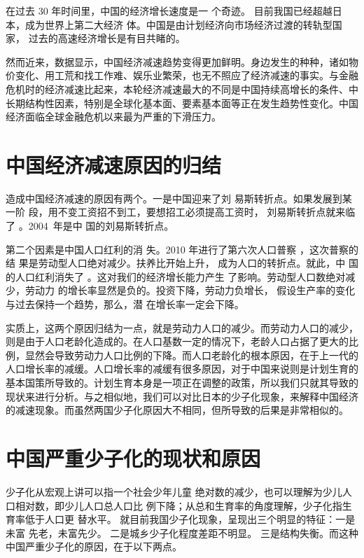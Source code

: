 \documentclass[cs5size,a4paper,nofonts]{ctexart}
\begin{document}
\begin{multicols}{2}

在过去 30 年时间里，中国的经济增长速度是一
个奇迹。
目前我国已经超越日本，成为世界上第二大经济
体。中国是由计划经济向市场经济过渡的转轨型国家，
过去的高速经济增长是有目共睹的。

然而近来，数据显示，中国经济减速趋势变得更加鲜明。身边发生的种种，诸如物价变化、用工荒和找工作难、娱乐业繁荣，也无不照应了经济减速的事实。与金融危机时的经济减速比起来，本轮经济减速最大的不同是中国持续高增长的条件、中长期结构性因素，特别是全球化基本面、要素基本面等正在发生趋势性变化。中国经济面临全球金融危机以来最为严重的下滑压力。

\section{中国经济减速原因的归结}

造成中国经济减速的原因有两个。一是中国迎来了刘
易斯转折点。如果发展到某一阶
段，用不变工资招不到工，要想招工必须提高工资时，
刘易斯转折点就来临了 。2004~年是中
国的刘易斯转折点。

第二个因素是中国人口红利的消
失。2010 年进行了第六次人口普察 \cite{jk}，这次普察的结
果是劳动型人口绝对减少。扶养比开始上升，
成为人口的转折点。就此，中
国的人口红利消失了 。这对我们的经济增长能力产生
了影响。劳动型人口数绝对减少，劳动力
的增长率显然是负的。投资下降，劳动力负增长，
假设生产率的变化与过去保持一个趋势，那么，潜
在增长率一定会下降。

实质上，这两个原因归结为一点，就是劳动力人口的减少。而劳动力人口的减少，则是由于人口老龄化造成的。在人口基数一定的情况下，老龄人口占据了更大的比例，显然会导致劳动力人口比例的下降。而人口老龄化的根本原因，在于上一代的人口增长率的减缓。人口增长率的减缓有很多原因，对于中国来说则是计划生育的基本国策所导致的。计划生育本身是一项正在调整的政策，所以我们只就其导致的现状来进行分析。与之相似地，我们可以对比日本的少子化现象，来解释中国经济的减速现象。而虽然两国少子化原因大不相同，但所导致的后果是非常相似的。

\section{中国严重少子化的现状和原因}

少子化从宏观上讲可以指一个社会少年儿童
绝对数的减少，也可以理解为少儿人口相对数，即少儿人口总人口比
例下降；从总和生育率的角度理解，少子化指生育率低于人口更
替水平。
就目前我国少子化现象，呈现出三个明显的特征：一是未富
先老，未富先少。
二是城乡少子化程度差距不明显。
三是结构失衡。而这种中国严重少子化的原因，在于以下两点。


\end{multicols}
\end{document}
